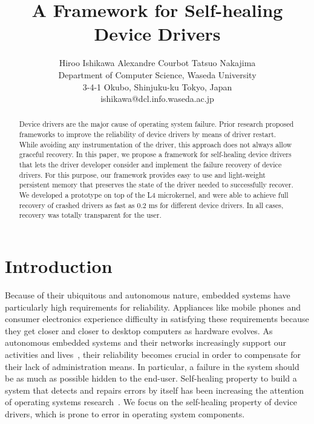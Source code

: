 \documentclass[times, 10pt, twocolumn]{article}
\begin{document}
\title{A Framework for Self-healing Device Drivers}

\author{
Hiroo Ishikawa\quad
Alexandre Courbot\quad
Tatsuo Nakajima\\
Department of Computer Science, Waseda University\\
3-4-1 Okubo, Shinjuku-ku Tokyo, Japan\\
ishikawa@dcl.info.waseda.ac.jp
}

\maketitle
\thispagestyle{empty}

\begin{abstract}
Device drivers are the major cause of operating system failure.  Prior research proposed frameworks to improve the reliability of device drivers by means of driver restart. While avoiding any instrumentation of the driver, this approach does not always allow graceful recovery. In this paper, we propose a framework for self-healing device drivers that lets the driver developer consider and implement the failure recovery of device drivers.  For this purpose, our framework provides easy to use and light-weight persistent memory that preserves the state of the driver needed to successfully recover. We developed a prototype on top of the L4 microkernel, and were able to achieve full recovery of crashed drivers as fast as 0.2 ms for different device drivers. In all cases, recovery was totally transparent for the user.
\end{abstract}


\section{Introduction}

Because of their ubiquitous and autonomous nature, embedded systems have particularly high requirements for reliability. Appliances like mobile phones and consumer electronics experience difficulty in satisfying these requirements because they get closer and closer to desktop computers as hardware evolves.  As autonomous embedded systems and their networks increasingly support our activities and lives~\cite{Lee2006}, their reliability becomes crucial in order to compensate for their lack of administration means. In particular, a failure in the system should be as much as possible hidden to the end-user.  Self-healing property to build a system that detects and repairs errors by itself has been increasing the attention of operating systems research~\cite{David2007}.  We focus on the self-healing property of device drivers, which is prone to error in operating system components.
\end{document}
